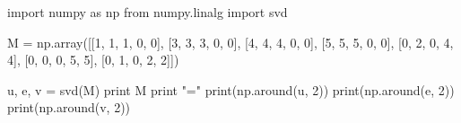 \documentclass[table,dvipsnames]{beamer}
\begin{document}

\begin{frame}[fragile]
\begin{code}
import numpy as np
from numpy.linalg import svd

M = np.array([[1, 1, 1, 0, 0],
              [3, 3, 3, 0, 0],
              [4, 4, 4, 0, 0],
              [5, 5, 5, 0, 0],
              [0, 2, 0, 4, 4],
              [0, 0, 0, 5, 5],
              [0, 1, 0, 2, 2]])

u, e, v = svd(M)
print M
print "="
print(np.around(u, 2))
print(np.around(e, 2))
print(np.around(v, 2))
\end{code}
\end{frame}
\end{document}
